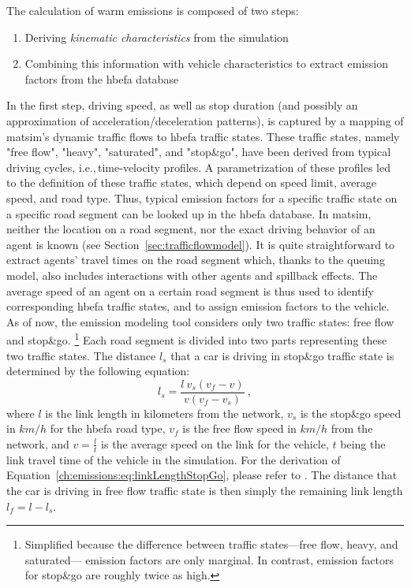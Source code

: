 The calculation of warm emissions is composed of two steps:
%
\begin{enumerate}
 \item Deriving \emph{kinematic characteristics} from the simulation
 \item Combining this information with vehicle characteristics to 
 extract emission factors from the \gls{hbefa} database
\end{enumerate}
%
In the first step, driving speed, as well as stop duration (and possibly an 
approximation of acceleration/deceleration patterns), is captured by a 
mapping of \gls{matsim}'s dynamic traffic flows to \gls{hbefa} traffic states. 
These traffic states, namely "free flow", "heavy", "saturated", and "stop\&go", 
have been derived from typical driving cycles, i.e.,\,time-velocity profiles. 
A parametrization of these profiles led to the definition of these traffic 
states, which depend on speed limit, average speed, and road type. Thus, 
typical emission factors for a specific traffic state on a specific road segment 
can be looked up in the \gls{hbefa} database.
%
In \gls{matsim}, neither the location on a road segment, nor the exact driving behavior of an agent is known (see Section~\ref{sec:trafficflowmodel}).
%
%
It is quite straightforward to extract agents' travel times on the road segment which, thanks to the queuing model, also includes interactions with other agents and spillback effects.
%
The average speed of an agent on a certain road segment is thus used to 
identify corresponding \gls{hbefa} traffic states, and to assign emission 
factors to the vehicle. As of now, the emission modeling tool considers only 
two traffic states: free flow and stop\&go.%
% 
\footnote{
%
Simplified because the difference between 
traffic states---free flow, heavy, and saturated--- emission factors are 
only marginal. In contrast, emission factors for 
stop\&go are roughly twice as high.
%
}
%
Each road segment is divided into two parts representing these two 
traffic states. The distance $l_s$ that a car is driving in stop\&go traffic 
state is determined by the following equation:
%
\begin{equation}
l_s = \frac{l \ v_s  (v_f-v)}{v (v_f - v_s)} \ ,
\label{ch:emissions:eq:linkLengthStopGo}
\end{equation}
%
where $l$ is the link length in kilometers from the network, $v_s$ is the stop\&go speed in $km/h$ for the \gls{hbefa} road type, $v_f$ is the free flow speed in $km/h$ from the network, and $v=\frac{l}{t}$ is the average speed on the link for the vehicle, $t$ being the link travel time of the vehicle in the simulation. For the derivation of Equation~\ref{ch:emissions:eq:linkLengthStopGo}, please refer to \citet{Kickhoefer_PhDThesis_2014}. The distance that the car is driving in free flow traffic state is then simply the remaining link length $l_f = l - l_s$.
